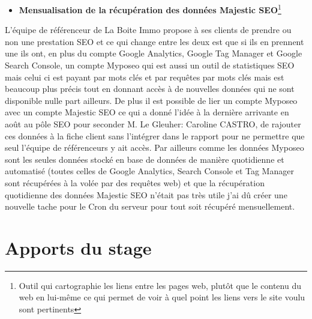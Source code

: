\documentclass[12pt]{article}
\begin{document}
\begin{itemize}
\item \textbf{Mensualisation de la récupération des données Majestic SEO}\footnote{Outil qui cartographie les liens entre les pages web, plutôt que le contenu du web en lui-même ce qui permet de voir à quel point les liens vers le site voulu sont pertinents}
\end{itemize}
L'équipe de référenceur de La Boite Immo propose à ses clients de prendre ou non une prestation SEO et ce qui change entre les deux est que si ils en prennent une ils ont, en plus du compte Google Analytics, Google Tag Manager et Google Search Console, un compte Myposeo qui est aussi un outil de statistiques SEO mais celui ci est payant par mots clés et par requêtes par mots clés mais est beaucoup plus précis tout en donnant accès à de nouvelles données qui ne sont disponible nulle part ailleurs. De plus il est possible de lier un compte Myposeo avec un compte Majestic SEO ce qui a donné l'idée à la dernière arrivante en août au pôle SEO pour seconder M. Le Gleuher: Caroline CASTRO, de rajouter ces données à la fiche client sans l'intégrer dans le rapport pour ne permettre que seul l'équipe de référenceurs y ait accès. Par ailleurs comme les données Myposeo sont les seules données stocké en base de données de manière quotidienne et automatisé (toutes celles de Google Analytics, Search Console et Tag Manager sont récupérées à la volée par des requêtes web) et que la récupération quotidienne des données Majestic SEO n'était pas très utile j'ai dû créer une nouvelle tache pour le Cron du serveur pour tout soit récupéré mensuellement.

\section{Apports du stage}
\end{document}
